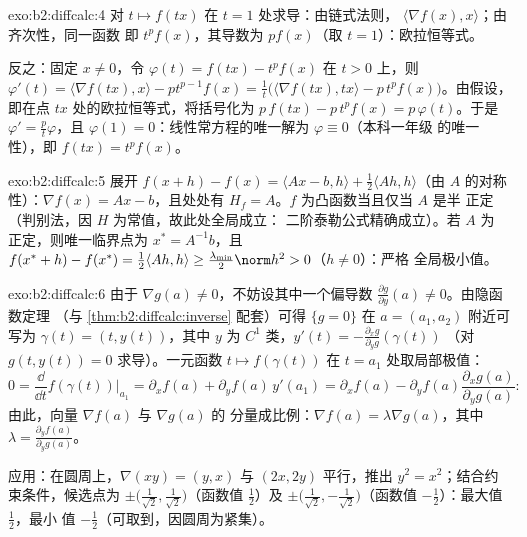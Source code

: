 \begin{solution}{exo:b2:diffcalc:4}
对 $t \mapsto f(tx)$ 在 $t = 1$ 处求导：由链式法则，
$\langle \nabla f(x), x\rangle$；由齐次性，同一函数
即 $t^pf(x)$，其导数为 $pf(x)$（取 $t = 1$）：欧拉恒等式。

反之：固定 $x \neq 0$，令 $\varphi(t) = f(tx) - t^p f(x)$
在 $t > 0$ 上，则 $\varphi'(t) = \langle\nabla f(tx), x\rangle -
pt^{p-1}f(x) = \frac1t\bigl(\langle \nabla f(tx), tx\rangle -
p\,t^pf(x)\bigr)$。由假设，即在点
$tx$ 处的欧拉恒等式，将括号化为 $p\,f(tx) - p\,t^pf(x) =
p\,\varphi(t)$。于是 $\varphi' = \frac{p}{t}\varphi$，且 $\varphi(1)
= 0$：线性常方程的唯一解为 $\varphi \equiv 0$（本科一年级
的唯一性），即 $f(tx) = t^pf(x)$。
\end{solution}

\begin{solution}{exo:b2:diffcalc:5}
展开 $f(x + h) - f(x) = \langle Ax - b, h\rangle +
\frac12\langle Ah, h\rangle$（由 $A$ 的对称性）：$\nabla f(x) = Ax -
b$，且处处有 $H_f = A$。$f$ 为凸函数当且仅当 $A$ 是半
正定（判别法，因 $H$ 为常值，故此处全局成立：
二阶泰勒公式精确成立）。若 $A$ 为
正定，则唯一临界点为 $x^* = A^{-1}b$，且 $f(x^*
+ h) - f(x^*) = \frac12\langle Ah, h\rangle \geq
\frac{\lambda_{\min}}{2}\norm h^2 > 0$（$h \neq 0$）：严格
全局极小值。
\end{solution}

\begin{solution}{exo:b2:diffcalc:6}
由于 $\nabla g(a) \neq 0$，不妨设其中一个偏导数 $\frac{\partial
g}{\partial y}(a) \neq 0$。由隐函数定理
（与 \cref{thm:b2:diffcalc:inverse} 配套）可得 $\{g =
0\}$ 在 $a = (a_1, a_2)$ 附近可写为 $\gamma(t) = (t, y(t))$，其中 $y$
为 $C^1$ 类，$y'(t) = -\frac{\partial_x g}{\partial_y g}(\gamma(t))$
（对 $g(t, y(t)) = 0$ 求导）。一元函数 $t
\mapsto f(\gamma(t))$ 在 $t = a_1$ 处取局部极值：
\[
0 = \frac{\dd}{\dd t}f(\gamma(t))\Big|_{a_1}
= \partial_x f(a) + \partial_y f(a)\,y'(a_1)
= \partial_x f(a) - \partial_yf(a)\frac{\partial_x
g(a)}{\partial_y g(a)} :
\]
由此，向量 $\nabla f(a)$ 与 $\nabla g(a)$ 的
分量成比例：$\nabla f(a) = \lambda \nabla g(a)$，其中 $\lambda =
\frac{\partial_y f(a)}{\partial_y g(a)}$。

应用：在圆周上，$\nabla(xy) = (y, x)$ 与
$(2x, 2y)$ 平行，推出 $y^2 = x^2$；结合约束条件，候选点为
$\pm\bigl(\tfrac{1}{\sqrt2}, \tfrac{1}{\sqrt2}\bigr)$（函数值
$\frac12$）及 $\pm\bigl(\tfrac{1}{\sqrt2},
-\tfrac{1}{\sqrt2}\bigr)$（函数值 $-\frac12$）：最大值 $\frac12$，最小
值 $-\frac12$（可取到，因圆周为紧集）。
\end{solution}

